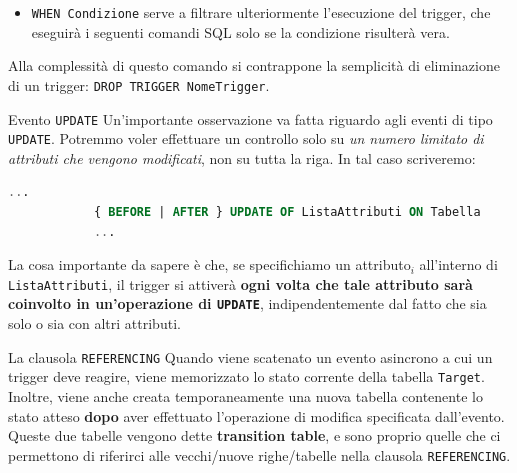 \documentclass[12pt]{report}
\begin{document}
\begin{itemize}
\begin{itemize}
			\item Con \texttt{STATEMENT} si fa in modo che il trigger venga eseguito \textbf{una singola volta per comando}. E con \textit{comando} si intende una \textbf{singola} \texttt{INSERT}, \texttt{UPDATE} o \texttt{DELETE}.
		\end{itemize}
		
		\item \texttt{WHEN Condizione} serve a filtrare ulteriormente l'esecuzione del trigger, che eseguirà i seguenti comandi SQL solo se la condizione risulterà vera.
	\end{itemize}
	
	Alla complessità di questo comando si contrappone la semplicità di eliminazione di un trigger: \texttt{DROP TRIGGER NomeTrigger}.
	
	\begin{osservazione}{Evento \texttt{UPDATE}}{}
		Un'importante osservazione va fatta riguardo agli eventi di tipo \texttt{UPDATE}. Potremmo voler effettuare un controllo solo su \textit{un numero limitato di attributi che vengono modificati}, non su tutta la riga. In tal caso scriveremo:
		\begin{lstlisting}[language=SQL]
			...
			{ BEFORE | AFTER } UPDATE OF ListaAttributi ON Tabella
			...
		\end{lstlisting}
		La cosa importante da sapere è che, se specifichiamo un attributo$_i$ all'interno di \texttt{ListaAttributi}, il trigger si attiverà \textbf{ogni volta che tale attributo sarà coinvolto in un'operazione di \texttt{UPDATE}}, indipendentemente dal fatto che sia solo o sia con altri attributi.
	\end{osservazione}
	
	\begin{osservazione}{La clausola \texttt{REFERENCING}}{}
		Quando viene scatenato un evento asincrono a cui un trigger deve reagire, viene memorizzato lo stato corrente della tabella \texttt{Target}. Inoltre, viene anche creata temporaneamente una nuova tabella contenente lo stato atteso \textbf{dopo} aver effettuato l'operazione di modifica specificata dall'evento. Queste due tabelle vengono dette \textbf{transition table}, e sono proprio quelle che ci permettono di riferirci alle vecchi/nuove righe/tabelle nella clausola \texttt{REFERENCING}.
	\end{osservazione}
	
\end{document}
